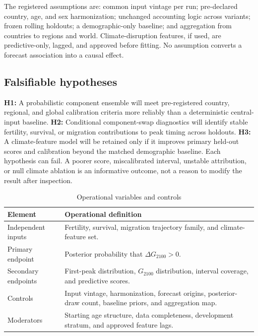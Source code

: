 \documentclass[conference]{IEEEtran}
\begin{document}
The registered assumptions are: common input vintage per run; pre-declared country, age, and sex harmonization; unchanged accounting logic across variants; frozen rolling holdouts; a demographic-only baseline; and aggregation from countries to regions and world. Climate-disruption features, if used, are predictive-only, lagged, and approved before fitting. No assumption converts a forecast association into a causal effect.

\subsection{Falsifiable hypotheses}

\textbf{H1:} A probabilistic component ensemble will meet pre-registered country, regional, and global calibration criteria more reliably than a deterministic central-input baseline. \textbf{H2:} Conditional component-swap diagnostics will identify stable fertility, survival, or migration contributions to peak timing across holdouts. \textbf{H3:} A climate-feature model will be retained only if it improves primary held-out scores and calibration beyond the matched demographic baseline. Each hypothesis can fail. A poorer score, miscalibrated interval, unstable attribution, or null climate ablation is an informative outcome, not a reason to modify the result after inspection.

\begin{table}[t]
\caption{Operational variables and controls}
\label{tab:variables}
\centering
\footnotesize
\begin{tabular}{L{0.23\columnwidth}L{0.61\columnwidth}}
\toprule
Element & Operational definition \\
\midrule
Independent inputs & Fertility, survival, migration trajectory family, and climate-feature set. \\
Primary endpoint & Posterior probability that $\Delta G_{2100}>0$. \\
Secondary endpoints & First-peak distribution, $G_{2100}$ distribution, interval coverage, and predictive scores. \\
Controls & Input vintage, harmonization, forecast origins, posterior-draw count, baseline priors, and aggregation map. \\
Moderators & Starting age structure, data completeness, development stratum, and approved feature lags. \\
\bottomrule
\end{tabular}
\end{table}
\end{document}
